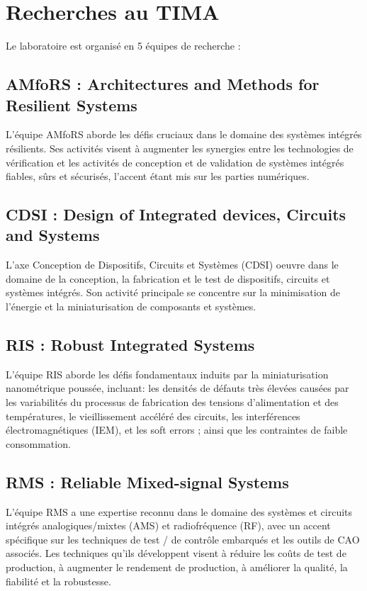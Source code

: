 \section{Recherches au TIMA}
Le laboratoire est organisé en 5 équipes de recherche :

\subsection[AMfoRS]{AMfoRS : Architectures and Methods for Resilient Systems}

L'équipe AMfoRS aborde les défis cruciaux dans le domaine des systèmes intégrés résilients.
Ses activités visent à augmenter les synergies entre les technologies de vérification 
et les activités de conception et de validation de systèmes intégrés fiables, sûrs et sécurisés, l'accent étant mis sur les parties numériques.

\subsection[CDSI]{CDSI : Design of Integrated devices, Circuits and Systems}

L'axe Conception de Dispositifs, Circuits et Systèmes (CDSI) oeuvre dans le domaine de la conception, 
la fabrication et le test de dispositifs, circuits et systèmes intégrés. 
Son activité principale se concentre sur la minimisation de l'énergie et la miniaturisation de composants et systèmes.

\subsection[RIS]{RIS : Robust Integrated Systems}

L'équipe RIS aborde les défis fondamentaux induits par la miniaturisation nanométrique poussée, 
incluant: les densités de défauts très élevées causées par les variabilités 
du processus de fabrication des tensions d’alimentation et des températures, le vieillissement accéléré des circuits, 
les interférences électromagnétiques (IEM), et les soft errors ; ainsi que les contraintes de faible consommation.

\subsection[RMS]{RMS : Reliable Mixed-signal Systems}

L'équipe RMS a une expertise reconnu dans le domaine des systèmes et circuits intégrés analogiques/mixtes (AMS) 
et radiofréquence (RF), avec un accent spécifique sur les techniques de test / de contrôle embarqués et les outils de CAO associés.
Les techniques qu'ils développent visent à réduire les coûts de test de production, 
à augmenter le rendement de production, à améliorer la qualité, la fiabilité et la robustesse.

